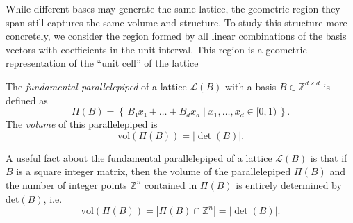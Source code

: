 While different bases may generate the same lattice, the geometric region they
span still captures the same volume and structure.
To study this structure more concretely, we consider the region formed by all
linear combinations of the basis vectors with coefficients in the unit
interval.
This region is a geometric representation of the “unit cell” of the lattice

\begin{definition}
  The \emph{fundamental parallelepiped} of a lattice $\mathcal{L}(B)$ with a basis $B ∈ ℤ^{d×d}$ is defined as
  \[
    Π(B) = \left\{\, B₁ x₁ + \dots + B_d x_d \mid x_1, \dots, x_d ∈ [0, 1) \,\right\}.
  \]
  The \emph{volume} of this parallelepiped is
  \[
    \mathrm{vol}(Π(B)) = |\det(B)|.
  \]
\end{definition}

A useful fact about the fundamental parallelepiped of a lattice $\mathcal L(B)$
is that if $B$ is a square integer matrix, then the volume of the
parallelepiped $Π(B)$ and the number of integer points $ℤ^n$ contained in
$Π(B)$ is entirely determined by $\mathrm{det}(B)$, i.e.
\[
  \mathrm{vol}(Π(B)) = |Π(B) ∩ ℤ^n| = |\det(B)|.
\]
